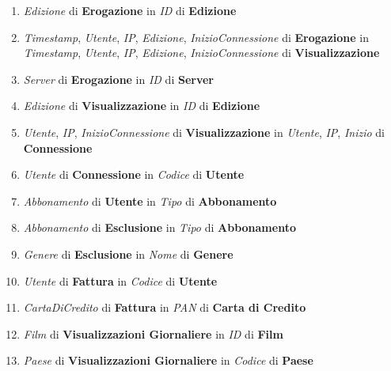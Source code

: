 \documentclass{article}
\begin{document}
\begin{enumerate}
    \item \textit{Edizione} di \textbf{Erogazione} in \textit{ID} di \textbf{Edizione}
    
    \item \textit{Timestamp}, \textit{Utente}, \textit{IP}, \textit{Edizione}, \textit{InizioConnessione} di \textbf{Erogazione} in \textit{Timestamp}, \textit{Utente}, \textit{IP}, \textit{Edizione}, \textit{InizioConnessione} di \textbf{Visualizzazione}
    
    \item \textit{Server} di \textbf{Erogazione} in \textit{ID} di \textbf{Server}
    
    \item \textit{Edizione} di \textbf{Visualizzazione} in \textit{ID} di \textbf{Edizione}
    
    \item \textit{Utente}, \textit{IP}, \textit{InizioConnessione} di \textbf{Visualizzazione} in \textit{Utente}, \textit{IP}, \textit{Inizio} di \textbf{Connessione}
    
    \item \textit{Utente} di \textbf{Connessione} in \textit{Codice} di \textbf{Utente}
    
    \item \textit{Abbonamento} di \textbf{Utente} in \textit{Tipo} di \textbf{Abbonamento}
    
    \item \textit{Abbonamento} di \textbf{Esclusione} in \textit{Tipo} di \textbf{Abbonamento}
    
    \item \textit{Genere} di \textbf{Esclusione} in \textit{Nome} di \textbf{Genere}
    
    \item \textit{Utente} di \textbf{Fattura} in \textit{Codice} di \textbf{Utente}
    
    \item \textit{CartaDiCredito} di \textbf{Fattura} in \textit{PAN} di \textbf{Carta di Credito}

    \item \textit{Film} di \textbf{Visualizzazioni Giornaliere} in \textit{ID} di \textbf{Film}
    
    \item \textit{Paese} di \textbf{Visualizzazioni Giornaliere} in \textit{Codice} di \textbf{Paese}
\end{enumerate}
\end{document}
